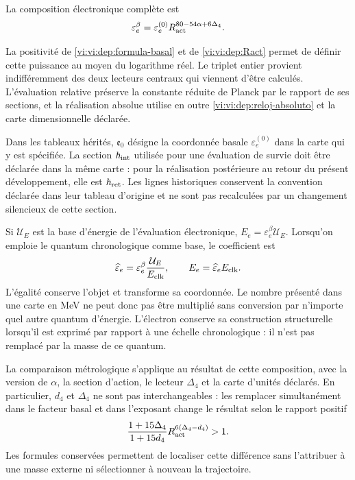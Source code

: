 \begin{definition}
La composition électronique complète est
\begin{equation}
 \varepsilon_e^\beta
  =\varepsilon_e^{(0)}
      R_{\rm act}^{80-54\alpha+6\Delta_4}.
 \label{vi:vi:dep:electron-beta}
\end{equation}
\end{definition}
La positivité de \eqref{vi:vi:dep:formula-basal} et de
\eqref{vi:vi:dep:Ract} permet de définir cette puissance au moyen du
logarithme réel. Le triplet entier provient indifféremment des deux
lecteurs centraux qui viennent d'être calculés. L'évaluation relative
préserve la constante réduite de Planck par le rapport de ses
sections, et la réalisation absolue utilise en outre
\eqref{vi:vi:dep:reloj-absoluto} et la carte dimensionnelle déclarée.

Dans les tableaux hérités, \(\mathfrak e_0\) désigne la
coordonnée basale \(\varepsilon_e^{(0)}\) dans la carte qui y est
spécifiée. La section \(\hbar_{\rm int}\) utilisée pour une
évaluation de survie doit être déclarée dans la même carte :
pour la réalisation postérieure au retour du présent développement,
elle est \(\hbar_{\rm ret}\). Les lignes historiques conservent la
convention déclarée dans leur tableau d'origine et ne sont pas recalculées par un
changement silencieux de cette section.

Si \(\mathcal U_E\) est la base d’énergie de l’évaluation
électronique, \(E_e=\varepsilon_e^\beta\mathcal U_E\). Lorsqu’on emploie
le quantum chronologique comme base, le coefficient est
\[
 \widehat\varepsilon_e
   =\varepsilon_e^\beta\frac{\mathcal U_E}{E_{\rm clk}},
 \qquad E_e=\widehat\varepsilon_e E_{\rm clk}.
\]
L'égalité conserve l'objet et transforme sa coordonnée. Le nombre
présenté dans une carte en MeV ne peut donc pas être multiplié
sans conversion par n'importe quel autre quantum d'énergie. L'électron
conserve sa construction structurelle lorsqu'il est exprimé par rapport à une
échelle chronologique : il n'est pas remplacé par la masse de ce quantum.

La comparaison métrologique s'applique au résultat de cette composition,
avec la version de \(\alpha\), la section d'action, le lecteur
\(\Delta_4\) et la carte d'unités déclarés. En particulier,
\(d_4\) et \(\Delta_4\) ne sont pas interchangeables : les remplacer
simultanément dans le facteur basal et dans l'exposant change le
résultat selon le rapport positif
\[
 \frac{1+15\Delta_4}{1+15d_4}
 R_{\rm act}^{6(\Delta_4-d_4)}>1.
\]
Les formules conservées permettent de localiser cette différence sans
l’attribuer à une masse externe ni sélectionner à nouveau la trajectoire.
